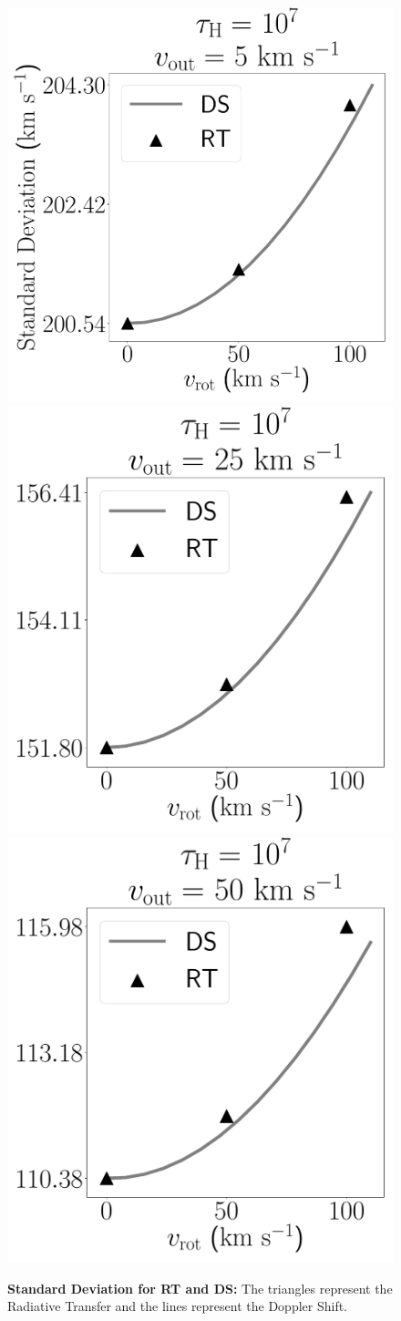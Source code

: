 \documentclass[a4paper,fleqn,usenatbib]{mnras}
\begin{document}
\begin{figure}
\begin{center}
\includegraphics[height=0.27\textwidth]{./figures/results/line_characterization_std_vout5_logtau7.pdf}
\includegraphics[height=0.27\textwidth]{./figures/results/line_characterization_std_vout25_logtau7.pdf}
\includegraphics[height=0.27\textwidth]{./figures/results/line_characterization_std_vout50_logtau7.pdf}
\end{center}
\caption{\textbf{Standard Deviation for RT and DS:} The triangles represent the Radiative
  Transfer and the lines represent the Doppler Shift.
  \label{fig:standard_deviation}}
\end{figure}
\end{document}

